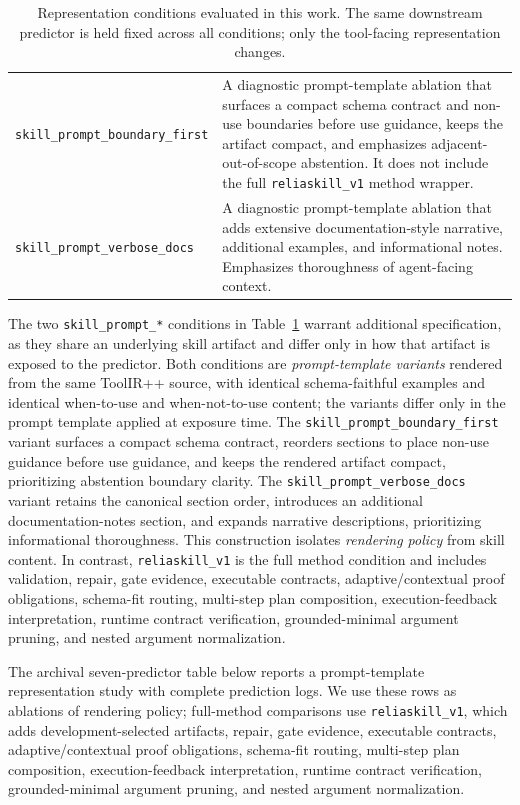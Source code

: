 \documentclass[11pt]{article}
\begin{document}
\begin{table}[t]
\begin{tabularx}{\columnwidth}{@{}p{}X@{}}
\addlinespace[2pt]
\texttt{skill\_prompt\_boundary\_first}
  & A diagnostic prompt-template ablation that surfaces a compact schema contract and non-use boundaries before use guidance, keeps the artifact compact, and emphasizes adjacent-out-of-scope abstention. It does not include the full \texttt{reliaskill\_v1} method wrapper. \\
\addlinespace[2pt]
\texttt{skill\_prompt\_verbose\_docs}
  & A diagnostic prompt-template ablation that adds extensive documentation-style narrative, additional examples, and informational notes. Emphasizes thoroughness of agent-facing context. \\
\bottomrule
\end{tabularx}
\caption{
Representation conditions evaluated in this work. The same downstream predictor is held fixed across all conditions; only the tool-facing representation changes.
}
\label{tab:setup_conditions}
\end{table}

The two \texttt{skill\_prompt\_*} conditions in Table~\ref{tab:setup_conditions} warrant additional specification, as they share an underlying skill artifact and differ only in how that artifact is exposed to the predictor. Both conditions are \emph{prompt-template variants} rendered from the same ToolIR++ source, with identical schema-faithful examples and identical when-to-use and when-not-to-use content; the variants differ only in the prompt template applied at exposure time. The \texttt{skill\_prompt\_boundary\_first} variant surfaces a compact schema contract, reorders sections to place non-use guidance before use guidance, and keeps the rendered artifact compact, prioritizing abstention boundary clarity. The \texttt{skill\_prompt\_verbose\_docs} variant retains the canonical section order, introduces an additional documentation-notes section, and expands narrative descriptions, prioritizing informational thoroughness. This construction isolates \emph{rendering policy} from skill content. In contrast, \texttt{reliaskill\_v1} is the full method condition and includes validation, repair, gate evidence, executable contracts, adaptive/contextual proof obligations, schema-fit routing, multi-step plan composition, execution-feedback interpretation, runtime contract verification, grounded-minimal argument pruning, and nested argument normalization.

The archival seven-predictor table below reports a prompt-template representation study with complete prediction logs. We use these rows as ablations of rendering policy; full-method comparisons use \texttt{reliaskill\_v1}, which adds development-selected artifacts, repair, gate evidence, executable contracts, adaptive/contextual proof obligations, schema-fit routing, multi-step plan composition, execution-feedback interpretation, runtime contract verification, grounded-minimal argument pruning, and nested argument normalization.
\end{document}
